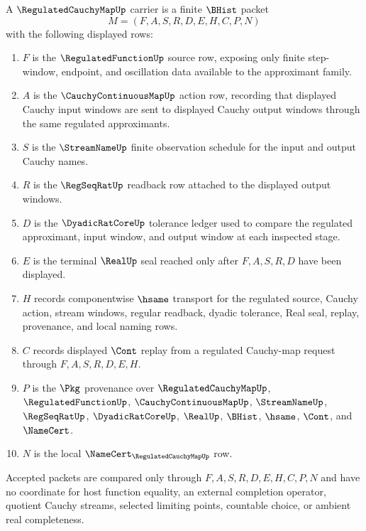 \begin{definition}
\label{def:regulated-cauchy-map-carrier}
A $\RegulatedCauchyMapUp$ carrier is a finite $\BHist$ packet
$$
M=(F,A,S,R,D,E,H,C,P,N)
$$
with the following displayed rows:
\begin{enumerate}
\item $F$ is the $\RegulatedFunctionUp$ source row, exposing only finite step-window, endpoint, and oscillation data available to the approximant family.
\item $A$ is the $\CauchyContinuousMapUp$ action row, recording that displayed Cauchy input windows are sent to displayed Cauchy output windows through the same regulated approximants.
\item $S$ is the $\StreamNameUp$ finite observation schedule for the input and output Cauchy names.
\item $R$ is the $\RegSeqRatUp$ readback row attached to the displayed output windows.
\item $D$ is the $\DyadicRatCoreUp$ tolerance ledger used to compare the regulated approximant, input window, and output window at each inspected stage.
\item $E$ is the terminal $\RealUp$ seal reached only after $F,A,S,R,D$ have been displayed.
\item $H$ records componentwise $\hsame$ transport for the regulated source, Cauchy action, stream windows, regular readback, dyadic tolerance, Real seal, replay, provenance, and local naming rows.
\item $C$ records displayed $\Cont$ replay from a regulated Cauchy-map request through $F,A,S,R,D,E,H$.
\item $P$ is the $\Pkg$ provenance over $\RegulatedCauchyMapUp$, $\RegulatedFunctionUp$, $\CauchyContinuousMapUp$, $\StreamNameUp$, $\RegSeqRatUp$, $\DyadicRatCoreUp$, $\RealUp$, $\BHist$, $\hsame$, $\Cont$, and $\NameCert$.
\item $N$ is the local $\NameCert_{\RegulatedCauchyMapUp}$ row.
\end{enumerate}
Accepted packets are compared only through $F,A,S,R,D,E,H,C,P,N$ and have no coordinate for host function equality, an external completion operator, quotient Cauchy streams, selected limiting points, countable choice, or ambient real completeness.
\end{definition}

